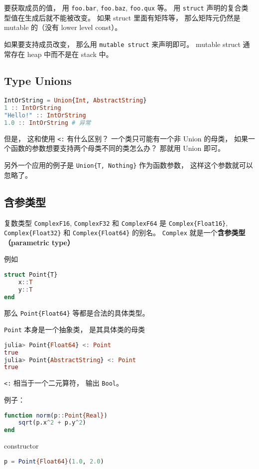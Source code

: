 要获取成员的值， 用 \verb|foo.bar|, \verb|foo.baz|, \verb|foo.qux| 等。 用 \verb|struct| 声明的复合类型值在生成后就不能被改变。 如果 struct 里面有矩阵等， 那么矩阵元仍然是 mutable 的（没有 lower level const）。

如果要支持成员改变， 那么用 \verb|mutable struct| 来声明即可。 mutable struct 通常存在 heap 中而不是在 stack 中。

\subsection{Type Unions}
\begin{lstlisting}[language=julia]
IntOrString = Union{Int, AbstractString}
1 :: IntOrString
"Hello!" :: IntOrString
1.0 :: IntOrString # 异常
\end{lstlisting}
但是， 这和使用 \verb|<:| 有什么区别？ 一个类只可能有一个非 Union 的母类， 如果一个函数的参数想要支持两个母类不同的类怎么办？ 那就用 Union 即可。

另外一个应用的例子是 \verb|Union{T, Nothing}| 作为函数参数， 这样这个参数就可以忽略了。

\subsection{含参类型}

复数类型 \verb|ComplexF16|, \verb|ComplexF32| 和 \verb|ComplexF64| 是 \verb|Complex{Float16}|, \verb|Complex{Float32}| 和 \verb|Complex{Float64}| 的别名。 \verb|Complex| 就是一个\textbf{含参类型（parametric type）}

例如
\begin{lstlisting}[language=julia]
struct Point{T}
    x::T
    y::T
end
\end{lstlisting}
那么 \verb|Point{Float64}| 等都是合法的具体类型。

\verb|Point| 本身是一个抽象类， 是其具体类的母类
\begin{lstlisting}[language=julia]
julia> Point{Float64} <: Point
true
julia> Point{AbstractString} <: Point
true
\end{lstlisting}
\verb|<:| 相当于一个二元算符， 输出 \verb|Bool|。

例子：
\begin{lstlisting}[language=julia]
function norm(p::Point{Real})
    sqrt(p.x^2 + p.y^2)
end
\end{lstlisting}
constructor
\begin{lstlisting}[language=julia]
p = Point{Float64}(1.0, 2.0)
\end{lstlisting}

